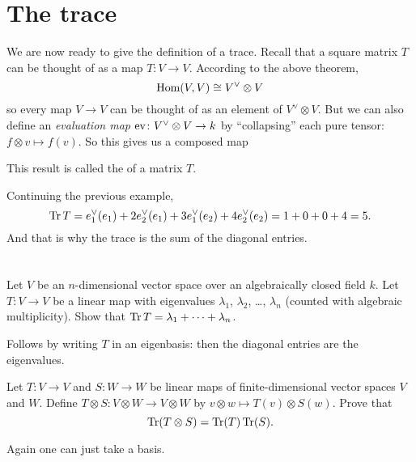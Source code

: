 \section{The trace}
We are now ready to give the definition of a trace.
Recall that a square matrix $T$ can be thought of as a map $T \colon V \to V$.
According to the above theorem,
\[ \operatorname{Hom}(V, V) \cong V^\vee \otimes V \]
so every map $V \to V$ can be thought of as an element of $V^\vee \otimes V$.
But we can also define an
\emph{evaluation map} $\operatorname{ev} \colon V^\vee \otimes V \to k$
by ``collapsing'' each pure tensor: $f \otimes v \mapsto f(v)$.
So this gives us a composed map
\begin{center}
\end{center}
This result is called the  of a matrix $T$.

\begin{example}
	Continuing the previous example,
	\[ \operatorname{Tr} T = e_1^\vee(e_1) + 2e_2^\vee(e_1)
		+ 3e_1^\vee(e_2) + 4e_2^\vee(e_2)
		= 1 + 0 + 0 + 4 = 5. \]
	And that is why the trace is the sum of the diagonal entries.
\end{example}

\section{\problemhead}

\begin{problem}
	Let $V$ be an $n$-dimensional vector space
	over an algebraically closed field $k$.
	Let $T \colon V \to V$ be a linear map with
	eigenvalues $\lambda_1$, $\lambda_2$, \dots, $\lambda_n$
	(counted with algebraic multiplicity).
	Show that $\operatorname{Tr} T = \lambda_1 + \dots + \lambda_n$.
	\begin{hint}
		Follows by writing $T$ in an eigenbasis:
		then the diagonal entries are the eigenvalues.
	\end{hint}
\end{problem}

\begin{dproblem}
	Let $T \colon V \to V$ and $S \colon W \to W$ be linear maps
	of finite-dimensional vector spaces $V$ and $W$.
	Define $T \otimes S \colon V \otimes W \to V \otimes W$
	by $v \otimes w \mapsto T(v) \otimes S(w)$.
	Prove that \[ \operatorname{Tr}(T \otimes S) = \operatorname{Tr}(T) \operatorname{Tr}(S). \]
	\begin{hint}
		Again one can just take a basis.
	\end{hint}
\end{dproblem}

